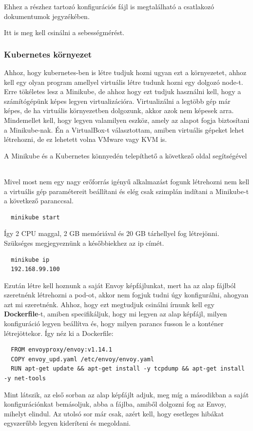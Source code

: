 \documentclass[a4paper,oneside]{article}
\begin{document}
Ehhez a részhez tartozó konfigurációs fájl is megtalálható a csatlakozó
dokumentumok jegyzékében.

Itt is meg kell csinálni a sebességmérést.
\subsubsection{Kubernetes környezet}
Ahhoz, hogy kubernetes-ben is létre tudjuk hozni ugyan ezt a környezetet, ahhoz kell
egy olyan program amellyel virtuális létre tudunk hozni egy dolgozó node-t.
Erre tökéletes lesz a Minikube, de ahhoz hogy ezt tudjuk használni kell, hogy
a számítógépünk képes legyen virtualizációra. Virtualizálni a legtöbb
gép már képes, de ha virtuális környezetben dolgozunk, akkor azok nem képesek arra.
Mindemellet kell, hogy legyen valamilyen eszköz, amely az alapot fogja
biztosítani a Minikube-nak. Én a VirtualBox-t választottam, amiben
virtuális gépeket lehet létrehozni, de ez lehetett volna VMware vagy KVM is.

A Minikube és a Kubernetes könnyedén telepíthető a következő oldal
segítségével ~\cite{installkubectl}

Mivel most nem egy nagy erőforrás igényű alkalmazást fogunk létrehozni nem
kell a virtuális gép paramétereit beállítani és elég csak szimplán indítani a
Minikube-t a következő paranccsal.
\begin{verbatim}
  minikube start
\end{verbatim}
Így 2 CPU maggal, 2 GB memóriával és 20 GB tárhellyel fog létrejönni. Szükséges
megjegyeznünk a későbbiekhez az ip címét.
\begin{verbatim}
  minikube ip
  192.168.99.100
\end{verbatim}
Ezután létre kell hoznunk a saját Envoy képfájlunkat, mert ha az alap
fájlból szeretnénk létrehozni a pod-ot, akkor nem fogjuk tudni úgy
konfigurálni, ahogyan azt mi szeretnénk. Ahhoz, hogy ezt megtudjuk csinálni
írnunk kell egy \textbf{Dockerfile}-t, amiben specifikáljuk, hogy mi legyen az
alap képfájl, milyen konfiguráció legyen beállítva és, hogy milyen parancs
fusson le a konténer létrejöttekor. Így néz ki a Dockerfile:
\begin{verbatim}
  FROM envoyproxy/envoy:v1.14.1
  COPY envoy_upd.yaml /etc/envoy/envoy.yaml
  RUN apt-get update && apt-get install -y tcpdump && apt-get install -y net-tools
\end{verbatim}
Mint látszik, az első sorban az alap képfájlt adjuk, meg míg a másodikban a
saját konfigurációnkat bemásoljuk, abba a fájlba, amiből dolgozni fog az Envoy,
mihelyt elindul. Az utolsó sor már csak, azért kell, hogy esetleges hibákat
egyszerűbb legyen kideríteni és megoldani.
\end{document}
